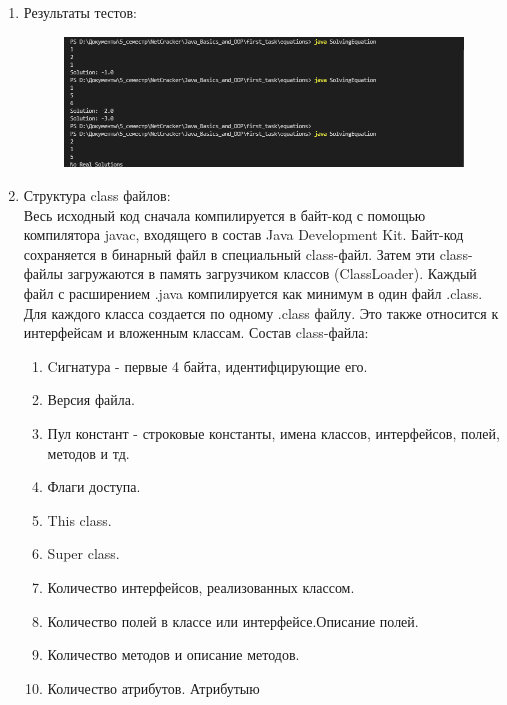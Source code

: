 \documentclass[a4paper]{article}
\begin{document}
\begin{enumerate}
\begin{lstlisting}
\end{lstlisting}

    \item Результаты тестов:
        
        \begin{figure}[h!]
            \begin{center}
                \includegraphics[scale = 0.6]{test_t1.png}
                \label{p2} %
            \end{center}
        \end{figure}
    
    \item Структура class файлов:
    \\
    Весь исходный код сначала компилируется в байт-код с помощью компилятора javac, входящего в состав Java Development Kit. 
    Байт-код сохраняется в бинарный файл в специальный class-файл. Затем эти class-файлы загружаются в память загрузчиком классов (ClassLoader).
    Каждый файл с расширением .java компилируется как минимум в один файл .class. Для каждого класса создается по одному .class файлу. Это также относится к интерфейсам и вложенным классам.
    Состав class-файла:
    \begin{enumerate}
        \item Cигнатура - первые 4 байта, идентифцирующие его.
        \item Версия файла.
        \item Пул констант - строковые константы, имена классов, интерфейсов, полей, методов и тд. 
        \item Флаги доступа.
        \item This class.
        \item Super class.
        \item Количество интерфейсов, реализованных классом.
        \item Количество полей в классе или интерфейсе.Описание полей.
        \item Количество методов и описание методов.
        \item Количество атрибутов. Атрибутыю
    \end{enumerate}
    

\end{enumerate}
\end{document}
